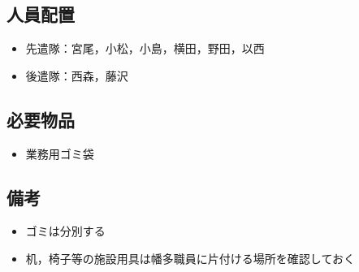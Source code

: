 \subsection{人員配置}
\begin{itemize}
\item 先遣隊：宮尾，小松，小島，横田，野田，以西
\item 後遣隊：西森，藤沢
\end{itemize}



\subsection{必要物品}
\begin{itemize}
\item 業務用ゴミ袋
\end{itemize}


\subsection{備考}
\begin{itemize}
\item ゴミは分別する
\item 机，椅子等の施設用具は幡多職員に片付ける場所を確認しておく
\end{itemize}


%

